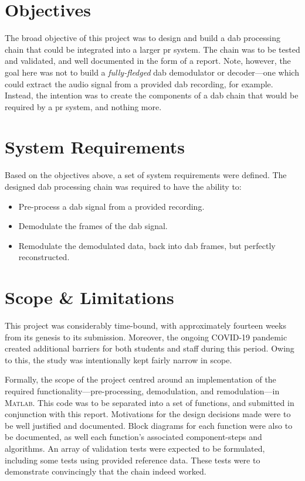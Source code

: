 \documentclass[class=report,11pt,crop=false]{standalone}
\begin{document}
\section{Objectives}
The broad objective of this project was to design and build a \gls{dab} processing chain that could be integrated into a larger \gls{pr} system. The chain was to be tested and validated, and well documented in the form of a report. Note, however, the goal here was not to build a \emph{fully-fledged} \gls{dab} demodulator or decoder---one which could extract the audio signal from a provided \gls{dab} recording, for example. Instead, the intention was to create the components of a \gls{dab} chain that would be required by a \gls{pr} system, and nothing more.

\section{System Requirements}
Based on the objectives above, a set of system requirements were defined. The designed \gls{dab} processing chain was required to have the ability to:
\begin{itemize}
    \item Pre-process a \gls{dab} signal from a provided recording.
    \item Demodulate the frames of the \gls{dab} signal.
    \item Remodulate the demodulated data, back into \gls{dab} frames, but perfectly reconstructed.
\end{itemize}

\section{Scope \& Limitations}
This project was considerably time-bound, with approximately fourteen weeks from its genesis to its submission. Moreover, the ongoing COVID-19 pandemic created additional barriers for both students and staff during this period. Owing to this, the study was intentionally kept fairly narrow in scope.

Formally, the scope of the project centred around an implementation of the required functionality---pre-processing, demodulation, and remodulation---in \textsc{Matlab}. This code was to be separated into a set of functions, and submitted in conjunction with this report. Motivations for the design decisions made were to be well justified and documented. Block diagrams for each function were also to be documented, as well each function's associated component-steps and algorithms. An array of validation tests were expected to be formulated, including some tests using provided reference data. These tests were to demonstrate convincingly that the chain indeed worked.
\end{document}
